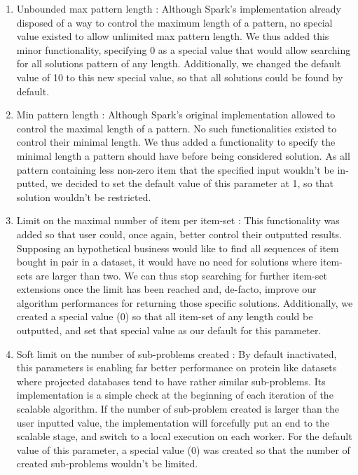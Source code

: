 \documentclass{eplmastersthesis}
\begin{document}
\begin{enumerate}
	\item Unbounded max pattern length : Although Spark's implementation already disposed of a way to control the maximum length of a pattern, no special value existed to allow unlimited max pattern length. We thus added this minor functionality, specifying 0 as a special value that would allow searching for all solutions pattern of any length. Additionally, we changed the default value of 10 to this new special value, so that all solutions could be found by default.
	\item Min pattern length : Although Spark's original implementation allowed to control the maximal length of a pattern. No such functionalities existed to control their minimal length. We thus added a functionality to specify the minimal length a pattern should have before being considered solution. As all pattern containing less non-zero item that the specified input wouldn't be in-putted, we decided to set the default value of this parameter at 1, so that solution wouldn't be restricted.
	\item Limit on the maximal number of item per item-set : This functionality was added so that user could, once again, better control their outputted results. Supposing an hypothetical business would like to find all sequences of item bought in pair in a dataset, it would have no need for solutions where item-sets are larger than two. We can thus stop searching for further item-set extensions once the limit has been reached and, de-facto, improve our algorithm performances for returning those specific solutions. Additionally, we created a special value (0) so that all item-set of any length could be outputted, and set that special value as our default for this parameter.
	\item Soft limit on the number of sub-problems created : By default inactivated, this parameters is enabling far better performance on protein like datasets where projected databases tend to have rather similar sub-problems. Its implementation is a simple check at the beginning of each iteration of the scalable algorithm. If the number of sub-problem created is larger than the user inputted value, the implementation will forcefully put an end to the scalable stage, and switch to a local execution on each worker.
	For the default value of this parameter, a special value (0) was created so that the number of created sub-problems wouldn't be limited.\newline
	

\end{enumerate}
\end{document}
